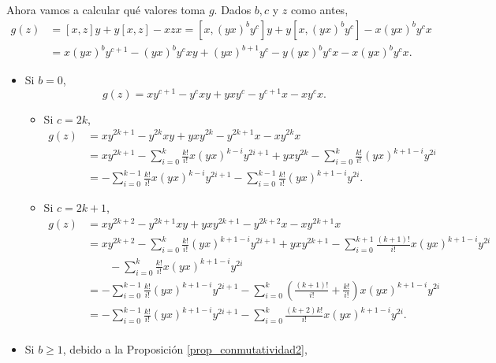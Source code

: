 \documentclass[fleqn,../tesis.tex]{subfiles}
\begin{document}
Ahora vamos a calcular qué valores toma $g$. Dados $b, c$ y $z$ como antes,
\begin{align*}
    g(z) &= \left[x,z\right]y + y\left[x,z\right] - xzx = \left[x, (yx)^by^c\right]y + y\left[x, (yx)^by^c\right] - x(yx)^by^c x\\
    &= x(yx)^by^{c + 1} - (yx)^by^{c}xy + (yx)^{b + 1}y^c - y(yx)^by^cx - x(yx)^by^cx.
\end{align*}
\begin{itemize}
    \item Si $b = 0$,
        \[
            g(z) = xy^{c + 1} - y^{c}xy + yxy^{c} - y^{c + 1}x - xy^{c}x.
        \]
        \begin{itemize}
            \item Si $c = 2k$,
            \begin{align*}
                g(z) &= xy^{2k + 1} - y^{2k}xy + yxy^{2k} - y^{2k + 1}x - xy^{2k}x\\
                &= xy^{2k + 1} - \sum_{i = 0}^{k}\frac{k!}{i!}x(yx)^{k - i}y^{2i + 1} + yxy^{2k}
                    - \sum_{i = 0}^{k}\frac{k!}{i!}(yx)^{k + 1 - i}y^{2i}\\
                &= - \sum_{i = 0}^{k - 1}\frac{k!}{i!}x(yx)^{k - i}y^{2i + 1} -  \sum_{i = 0}^{k - 1}\frac{k!}{i!}(yx)^{k + 1 - i}y^{2i}.
            \end{align*}
            \item Si $c = 2k + 1$,
            \begin{align*}
                g(z) &= xy^{2k + 2} - y^{2k + 1}xy + yxy^{2k + 1} - y^{2k + 2}x - xy^{2k + 1}x\\
                &= xy^{2k + 2} - \sum_{i = 0}^{k}\frac{k!}{i!}(yx)^{k + 1 - i}y^{2i + 1} + yxy^{2k + 1}
                    - \sum_{i = 0}^{k + 1}\frac{(k+ 1)!}{i!}x(yx)^{k + 1 -i}y^{2i} \\
                    &\qquad - \sum_{i = 0}^{k}\frac{k!}{i!}x(yx)^{k + 1 -i}y^{2i}\\
                &= - \sum_{i = 0}^{k - 1}\frac{k!}{i!}(yx)^{k + 1 - i}y^{2i + 1}
                    - \sum_{i = 0}^{k}\left(\frac{(k+ 1)!}{i!} + \frac{k!}{i!}\right)x(yx)^{k + 1 -i}y^{2i}\\
                &= - \sum_{i = 0}^{k - 1}\frac{k!}{i!}(yx)^{k + 1 - i}y^{2i + 1}
                    - \sum_{i = 0}^{k}\frac{(k + 2)k!}{i!}x(yx)^{k + 1 -i}y^{2i}.\\
            \end{align*}
        \end{itemize}
    \item Si $b \geq 1$, debido a la Proposición \ref{prop_conmutatividad2},

\end{itemize}
\end{document}
